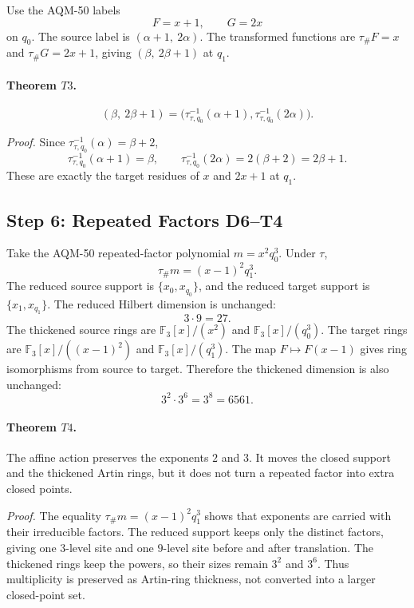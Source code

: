 Use the AQM-50 labels
\[
  F=x+1,\qquad G=2x
\]
on \(q_0\).  The source label is \((\alpha+1,\ 2\alpha)\).  The transformed
functions are \(\tau_\#F=x\) and \(\tau_\#G=2x+1\), giving
\((\beta,\ 2\beta+1)\) at \(q_1\).

\paragraph{Theorem \(T3\).}
\[
  (\beta,\ 2\beta+1)=
  \bigl(\tau_{\tau,q_0}^{-1}(\alpha+1),
        \tau_{\tau,q_0}^{-1}(2\alpha)\bigr).
\]

\emph{Proof.}
Since \(\tau_{\tau,q_0}^{-1}(\alpha)=\beta+2\),
\[
  \tau_{\tau,q_0}^{-1}(\alpha+1)=\beta,\qquad
  \tau_{\tau,q_0}^{-1}(2\alpha)=2(\beta+2)=2\beta+1.
\]
These are exactly the target residues of \(x\) and \(2x+1\) at \(q_1\).

\subsection{Step 6: Repeated Factors D6--T4}
Take the AQM-50 repeated-factor polynomial \(m=x^2q_0^3\).
Under \(\tau\),
\[
  \tau_\#m=(x-1)^2q_1^3.
\]
The reduced source support is \(\{x_0,x_{q_0}\}\), and the reduced target
support is \(\{x_1,x_{q_1}\}\).  The reduced Hilbert dimension is unchanged:
\[
  3\cdot9=27.
\]
The thickened source rings are \(\mathbb F_3[x]/(x^2)\) and
\(\mathbb F_3[x]/(q_0^3)\).  The target rings are
\(\mathbb F_3[x]/((x-1)^2)\) and \(\mathbb F_3[x]/(q_1^3)\).  The map
\(F\mapsto F(x-1)\) gives ring isomorphisms from source to target.  Therefore
the thickened dimension is also unchanged:
\[
  3^2\cdot3^6=3^8=6561.
\]

\paragraph{Theorem \(T4\).}
The affine action preserves the exponents \(2\) and \(3\).  It moves the
closed support and the thickened Artin rings, but it does not turn a repeated
factor into extra closed points.

\emph{Proof.}
The equality \(\tau_\#m=(x-1)^2q_1^3\) shows that exponents are carried with
their irreducible factors.  The reduced support keeps only the distinct
factors, giving one \(3\)-level site and one \(9\)-level site before and after
translation.  The thickened rings keep the powers, so their sizes remain
\(3^2\) and \(3^6\).  Thus multiplicity is preserved as Artin-ring thickness,
not converted into a larger closed-point set.

